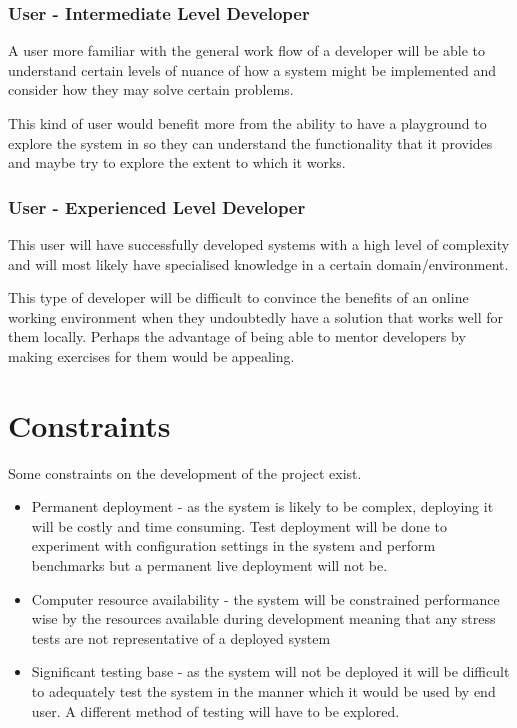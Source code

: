 \subsubsection{User - Intermediate Level Developer}
A user more familiar with the general work flow of a developer will be able to understand certain levels of nuance of how a system might be implemented and consider how they may solve certain problems.

This kind of user would benefit more from the ability to have a playground to explore the system in so they can understand the functionality that it provides and maybe try to explore the extent to which it works.

\subsubsection{User - Experienced Level Developer}
This user will have successfully developed systems with a high level of complexity and will most likely have specialised knowledge in a certain domain/environment.

This type of developer will be difficult to convince the benefits of an online working environment when they undoubtedly have a solution that works well for them locally. Perhaps the advantage of being able to mentor developers by making exercises for them would be appealing.

\section{Constraints} \label{section:probart-constraints}
Some constraints on the development of the project exist.

\begin{itemize}
    \item Permanent deployment - as the system is likely to be complex, deploying it will be costly and time consuming. Test deployment will be done to experiment with configuration settings in the system and perform benchmarks but a permanent live deployment will not be.
    \item Computer resource availability - the system will be constrained performance wise by the resources available during development meaning that any stress tests are not representative of a deployed system
    \item Significant testing base - as the system will not be deployed it will be difficult to adequately test the system in the manner which it would be used by end user. A different method of testing will have to be explored.
\end{itemize}


